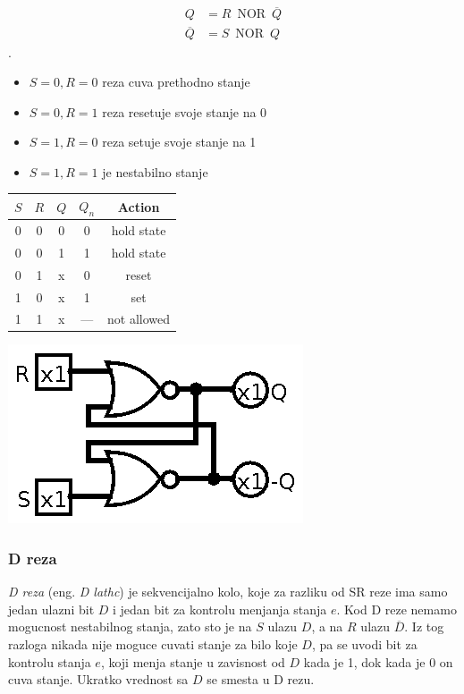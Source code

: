 \documentclass[12p,a4paper]{article}
\DeclareMathOperator{\NOR}{NOR}
\begin{document}
\begin{multicols}{2}
    \begin{align*}
        Q &= R \ \NOR\ \overline{Q} \\
        \overline{Q} &= S \ \NOR\ Q 
    \end{align*}.
    \begin{itemize}
        \itemsep0em
        \item $S = 0, R = 0$ reza cuva prethodno stanje
        \item $S = 0, R = 1$ reza resetuje svoje stanje na 0
        \item $S = 1, R = 0$ reza setuje svoje stanje na 1
        \item $S = 1, R = 1$ je nestabilno stanje 
    \end{itemize}

    \begin{tabular}{*{5}{c}}
        $S$ & $R$ & $Q$ & $Q_n$ & Action \\
        \midrule
         0  &  0  &  0  &  0  & hold state\\
         0  &  0  &  1  &  1  & hold state\\
         0  &  1  &  x  &  0  & reset \\
         1  &  0  &  x  &  1  & set \\
         1  &  1  &  x  & --- & not allowed \\
    \end{tabular}

    \includegraphics[width=0.5\columnwidth]{Figures/sr_latch.png}

    \subsubsection{D reza}

    \emph{D reza} (eng. \emph{D lathc}) je sekvencijalno kolo, koje za
    razliku od SR reze ima samo jedan ulazni bit $D$ i jedan bit za kontrolu 
    menjanja stanja $e$. Kod D reze nemamo mogucnost nestabilnog stanja, zato
    sto je na $S$ ulazu $D$, a na $R$ ulazu $\overline{D}$. Iz tog razloga
    nikada nije moguce cuvati stanje za bilo koje $D$, pa se uvodi bit za 
    kontrolu stanja $e$, koji menja stanje u zavisnost od $D$ kada je 1, dok
    kada je 0 on cuva stanje. Ukratko vrednost sa $D$ se smesta u D rezu.


\end{multicols}
\end{document}
